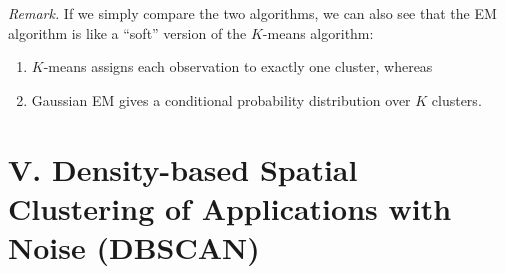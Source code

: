 \documentclass[12pt]{article}
\begin{document}
\begin{enumerate}[label=\textbf{\arabic*.}]
	\textit{Remark.} If we simply compare the two algorithms, we can also see that the EM algorithm is like a ``soft'' version of the $K$-means algorithm: 
	\begin{enumerate}
		\item $K$-means assigns each observation to exactly one cluster, whereas 
		\item Gaussian EM gives a conditional probability distribution over $K$ clusters. 
	\end{enumerate}
	
\end{enumerate}


\section*{V. Density-based Spatial Clustering of Applications with Noise (DBSCAN)}
\end{document}
